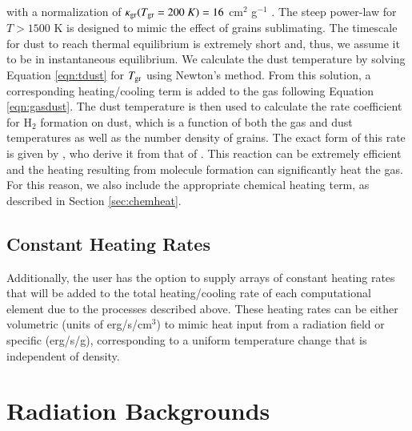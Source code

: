 with a normalization of $\kappa_{\rm gr}(T_{\rm gr} = 200~K) = 16$ cm$^{2}$ g$^{-1}$
\citep{1994ApJ...421..615P, 2000ApJ...534..809O}.  The steep power-law
for $T > 1500$ K is designed to mimic the effect of grains sublimating.
The timescale for dust to reach thermal equilibrium is extremely
short and, thus, we assume it to be in instantaneous equilibrium.  We
calculate the dust temperature by solving Equation \ref{eqn:tdust} for
$T_{\rm gr}$ using Newton's method.  From this solution, a corresponding
heating/cooling term is added to the gas following Equation
\ref{eqn:gasdust}.  The dust temperature is then used to calculate the
rate coefficient for H$_{2}$ formation on dust, which is a function of
both the gas and dust temperatures as well as the number density of
grains.  The exact form of this rate is given by
\citet{2000ApJ...534..809O}, who derive it from that of
\citet{1985ApJ...291..722T}.  This reaction can be extremely
efficient and the heating resulting from molecule formation can
significantly heat the gas.  For this reason, we also include the
appropriate chemical heating term, as described in Section
\ref{sec:chemheat}.

\subsection{Constant Heating Rates}
\label{section:constant-heating}

Additionally, the user has the option to supply arrays of constant
heating rates that will be added to the total heating/cooling rate
of each computational element due to the processes described above.
These heating rates can be either volumetric (units of
erg/s/cm$^{3}$) to mimic heat input from a radiation field or
specific (erg/s/g), corresponding to a uniform temperature change that
is independent of density.




\section{Radiation Backgrounds}
\label{section:radback}

